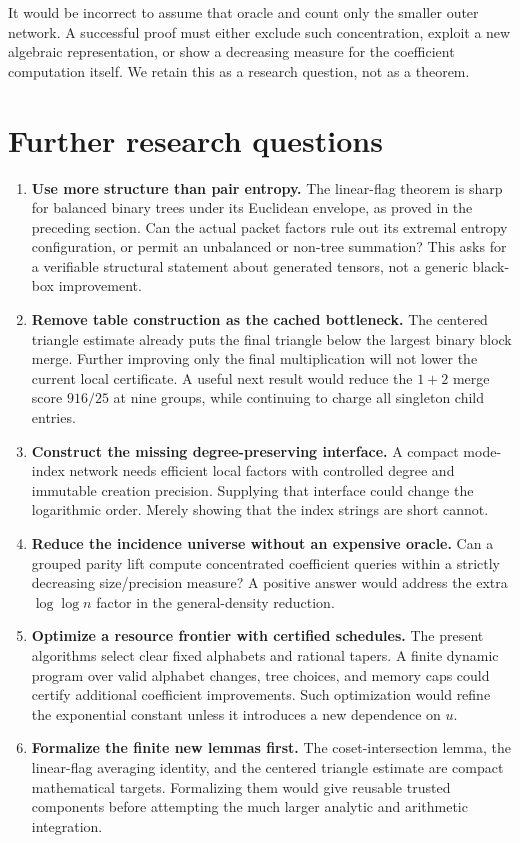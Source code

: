 It would be incorrect to assume that oracle and count only the
smaller outer network. A successful proof must either exclude
such concentration, exploit a new algebraic representation, or
show a decreasing measure for the coefficient computation itself.
We retain this as a research question, not as a theorem.

\section{Further research questions}
\label{sec:further}

\begin{enumerate}
\item \textbf{Use more structure than pair entropy.}
The linear-flag theorem is sharp for balanced binary trees under
its Euclidean envelope, as proved in the preceding section.
Can the actual packet factors rule out its extremal entropy
configuration, or permit an unbalanced or non-tree summation?
This asks for a verifiable structural statement about generated
tensors, not a generic black-box improvement.

\item \textbf{Remove table construction as the cached bottleneck.}
The centered triangle estimate already puts the final triangle
below the largest binary block merge. Further improving only
the final multiplication will not lower the current local
certificate. A useful next result would reduce the $1+2$
merge score $916/25$ at nine groups, while continuing to charge
all singleton child entries.

\item \textbf{Construct the missing degree-preserving interface.}
A compact mode-index network needs efficient local factors with
controlled degree and immutable creation precision. Supplying
that interface could change the logarithmic order. Merely
showing that the index strings are short cannot.

\item \textbf{Reduce the incidence universe without an expensive oracle.}
Can a grouped parity lift compute concentrated coefficient
queries within a strictly decreasing size/precision measure?
A positive answer would address the extra $\log\log n$ factor
in the general-density reduction.

\item \textbf{Optimize a resource frontier with certified schedules.}
The present algorithms select clear fixed alphabets and rational
tapers. A finite dynamic program over valid alphabet changes,
tree choices, and memory caps could certify additional coefficient
improvements. Such optimization would refine the exponential
constant unless it introduces a new dependence on $u$.

\item \textbf{Formalize the finite new lemmas first.}
The coset-intersection lemma, the linear-flag averaging identity,
and the centered triangle estimate are compact mathematical
targets. Formalizing them would give reusable trusted
components before attempting the much larger analytic and
arithmetic integration.
\end{enumerate}
